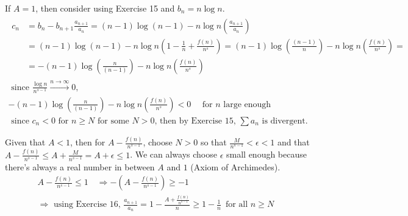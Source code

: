 \documentclass[twoside]{amsart}
\theoremstyle{plain}
\theoremstyle{definition}
\begin{document}
If $A=1$, then consider using Exercise 15 and $b_n = n \log{n}$.  
\[
\begin{gathered}
  \begin{aligned}
c_n & = b_n - b_{n+1} \frac{a_{n+1}}{ a_n } = (n-1) \log{ (n-1) } - n \log{n} \left( \frac{a_{n+1}}{ a_n } \right) \\
& = (n-1)\log{ (n-1)} - n \log{n} \left( 1 - \frac{1}{n} + \frac{f(n)}{ n^s} \right) = (n-1)\log{ \left( \frac{ (n-1) }{ n } \right) } - n\log{n} \left( \frac{f(n)}{ n^s } \right)  = \\
& = -(n-1) \log{ \left( \frac{ n }{ (n-1) } \right) } - n\log{n} \left( \frac{f(n) }{n^s} \right)
\end{aligned} \\
  \text{ since $\frac{ \log{n}}{ n^{s-1} } \xrightarrow{n\to \infty} 0$, } \\
   -(n-1) \log{ \left( \frac{ n }{ (n-1) } \right) } - n\log{n} \left( \frac{f(n) }{n^s} \right) < 0 \quad \text{ for $n$ large enough } \\
   \text{ since $c_n < 0$ for $n\geq N$ for some $N>0$, then by Exercise 15, $\sum a_n$ is divergent. }
\end{gathered}
\]

Given that $A<1$, then for $A - \frac{f(n)}{ n^{s-1} }$, choose $N >0$ so that $\frac{M}{n^{s-1}} < \epsilon <1$ and that $A - \frac{f(n)}{n^{s-1}} \leq A + \frac{M}{n^{s-1}} = A + \epsilon \leq 1$.  We can always choose $\epsilon$ small enough because there's always a real number in between $A$ and $1$ (Axiom of Archimedes).  
\[
\begin{gathered}
  A - \frac{ f(n)}{ n^{s-1} } \leq 1 \quad \Longrightarrow - \left( A - \frac{ f(n)}{ n^{s-1}} \right) \geq -1  \\
\Longrightarrow \text{ using Exercise 16, } \frac{ a_{n+1}}{ a_n } = 1 - \frac{ A + \frac{ f(n)}{ n^{s-1} } }{ n } \geq 1 - \frac{1}{n } \, \text{ for all $n \geq N$ } 
\end{gathered}
\]
\end{document}
